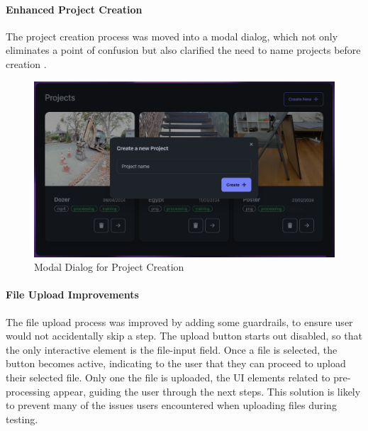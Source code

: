 \paragraph{Enhanced Project Creation}
The project creation process was moved into a modal dialog, which not only eliminates a point of confusion but also clarified the need to name projects before creation .

\begin{figure}[htb]
	\includegraphics[width=\textwidth]{figures/fix-3.png}
	\caption{Modal Dialog for Project Creation}
  \label{fig:fix-3}
\end{figure}

\paragraph{File Upload Improvements}
The file upload process was improved by adding some guardrails, to ensure user would not accidentally skip a step.
The upload button starts out disabled, so that the only interactive element is the file-input field.
Once a file is selected, the button becomes active, indicating to the user that they can proceed to upload their selected file.
Only one the file is uploaded, the UI elements related to pre-processing appear, guiding the user through the next steps.
This solution is likely to prevent many of the issues users encountered when uploading files during testing. 


